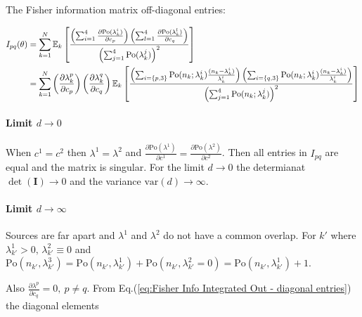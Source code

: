 The Fisher information matrix off-diagonal entries:

\begin{alignat}{1}
	I_{pq}(\theta) & =\sum_{k=1}^{N}\mathbb{E}_{k}\left[\frac{\left(\sum_{i=1}^{4}\frac{\partial\textrm{Po}(\textrm{\ensuremath{\lambda}}_{k}^{i})}{\partial c_{p}}\right)\left(\sum_{l=1}^{4}\frac{\partial\textrm{Po}(\textrm{\ensuremath{\lambda}}_{k}^{l})}{\partial c_{q}}\right)}{\left(\sum_{j=1}^{4}\textrm{Po}(\lambda_{k}^{j})\right)^{2}}\right]\nonumber \\
	 & =\sum_{k=1}^{N}\left(\frac{\partial\lambda_{k}^{p}}{\partial c_{p}}\right)\left(\frac{\partial\lambda_{k}^{q}}{\partial c_{q}}\right)\mathbb{E}_{k}\left[\frac{\left(\sum_{i=\{p,3\}}\mathrm{Po}(n_{k};\lambda_{k}^{i})\frac{(n_{k}-\lambda_{k}^{i})}{\lambda_{k}^{i}}\right)\left(\sum_{i=\{q,3\}}\mathrm{Po}(n_{k};\lambda_{k}^{i})\frac{(n_{k}-\lambda_{k}^{i})}{\lambda_{k}^{i}}\right)}{\left(\sum_{j=1}^{4}\textrm{Po}(n_{k};\lambda_{k}^{j})\right)^{2}}\right]
	 \label{eq:Fisher Info Integrated Out-off diagonal entries}
\end{alignat}

\paragraph{Limit $d\rightarrow0$}

When $c^{1}=c^{2}$ then $\lambda^{1}=\lambda^{2}$ and $\frac{\partial\text{Po}(\lambda^{1})}{\partial c^{1}}=\frac{\partial\text{Po}(\lambda^{2})}{\partial c^{2}}$. Then all entries in $I_{pq}$ are equal and the matrix is singular. For the limit $d\rightarrow0$ the determianat $\det(\bm{I})\rightarrow0$ and the variance $\text{var}(d)\rightarrow\infty$.

\paragraph{Limit $d\rightarrow\infty$}

Sources are far apart and $\lambda^{1}$ and $\lambda^{2}$ do not have a common overlap. For $k'$ where $\lambda_{k'}^{1}>0,\,\lambda_{k'}^{2}\equiv0$ and $\text{Po}(n_{k'},\lambda_{k'}^{3})=\text{Po}(n_{k'},\lambda_{k'}^{1})+\text{Po}(n_{k'},\lambda_{k'}^{2}=0)=\text{Po}(n_{k'},\lambda_{k'}^{1})+1$.

Also $\frac{\partial\lambda^{p}}{\partial c_{q}}=0,\: p\neq q$. From Eq.(\ref{eq:Fisher Info Integrated Out - diagonal entries}) the diagonal
elements 


